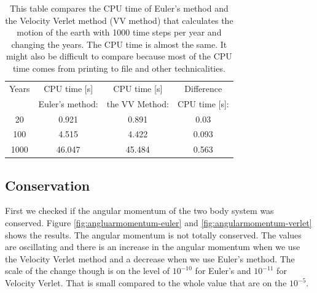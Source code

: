 \begin{table}[H]\caption{This table compares the CPU time of Euler's method and the Velocity Verlet method (VV method) that calculates the motion of the earth with 1000 time steps per year and changing the years. The CPU time is almost the same. It might also be difficult to compare because most of the CPU time comes from printing to file and other technicalities.}\label{tab:CPUtime}
\begin{tabular}[width=\linewidth]{cccc}
Years & \small{CPU time [s]}  & \small{CPU time [s]} & \small{Difference}\\ 
& \small{Euler's method:} & \small{the VV Method}: & \small{CPU time [s]:}\\ \hline
20 & 0.921 & 0.891 & 0.03\\
100 & 4.515 & 4.422 & 0.093\\
1000 & 46.047 & 45.484 & 0.563\\
\end{tabular}
\end{table}

%	

\subsection{Conservation}

First we checked if the angular momentum of the two body system was conserved. Figure \ref{fig:angluarmomentum-euler} and \ref{fig:angularmomentum-verlet} shows the results. The angular momentum is not totally conserved. The values are oscillating and there is an increase in the angular momentum when we use the Velocity Verlet method and a decrease when we use Euler's method. The scale of the change though is on the level of $10^{-10}$ for Euler's and $10^{-11}$ for Velocity Verlet. That is small compared to the whole value that are on the $10^{-5}$.

